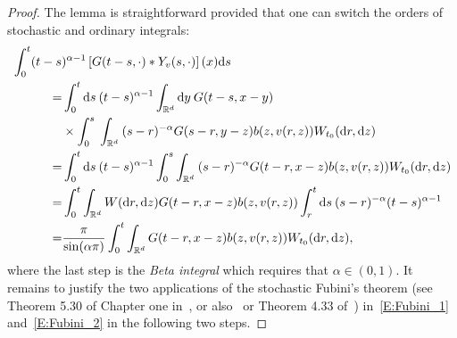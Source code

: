 \documentclass[a4paper,11pt]{article}%
\theoremstyle{plain}
\theoremstyle{definition}
\numberwithin{equation}{section}
\newcommand{\R}{\mathbb{R}}
\newcommand{\ud}{\ensuremath{\mathrm{d}}}
\begin{document}
\begin{proof}
  The lemma is straightforward provided that one can switch the orders of stochastic and ordinary
  integrals:
  \begin{align}
    \MoveEqLeft[4] \int_0^t (t-s)^{\alpha-1}\left[G(t-s,\cdot)*Y_v(s,\cdot)\right](x) \ud s \notag \\
    = & \int_0^t \ud s\: (t-s)^{\alpha-1}\int_{\R^d} \ud y\: G(t-s,x-y) \notag                                                                \\
      & \times \int_0^s\: \int_{\R^d} \: (s-r)^{-\alpha}G(s-r,y-z)b(z,v(r,z))W_{t_0}(\ud r,\ud z) \notag                                      \\
    = & \int_0^t \ud s\: (t-s)^{\alpha-1} \int_0^s \int_{\R^d} \: (s-r)^{-\alpha}G(t-r,x-z)b(z,v(r,z))W_{t_0}(\ud r,\ud z) \label{E:Fubini_1} \\
    = & \int_0^t \int_{\R^d} W(\ud r,\ud z)G(t-r,x-z)b(z,v(r,z)) \int_r^t \ud s\: (s-r)^{-\alpha} (t-s)^{\alpha-1}\label{E:Fubini_2}          \\
    = & \dfrac{\pi}{\sin(\alpha \pi)}\int_0^t \int_{\R^d} G(t-r,x-z)b(z,v(r,z)) W_{t_0}(\ud r,\ud z),\notag
  \end{align}
  where the last step is the \textit{Beta integral} which requires that $\alpha\in (0,1)$. It
  remains to justify the two applications of the stochastic Fubini's theorem (see Theorem 5.30 of
  Chapter one in~\cite{dalang.khoshnevisan.ea:09:minicourse}, or also~\cite{walsh:86:introduction}
  or Theorem 4.33 of~\cite{da-prato.zabczyk:14:stochastic}) in~\eqref{E:Fubini_1}
  and~\eqref{E:Fubini_2} in the following two steps. \bigskip


\end{proof}
\end{document}
